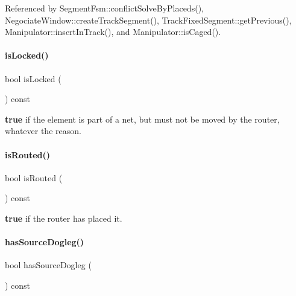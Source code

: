 Referenced by Segment\+Fsm\+::conflict\+Solve\+By\+Placeds(), Negociate\+Window\+::create\+Track\+Segment(), Track\+Fixed\+Segment\+::get\+Previous(), Manipulator\+::insert\+In\+Track(), and Manipulator\+::is\+Caged().

\mbox{\label{classKite_1_1TrackElement_a43966e19963e4bcb7f7f9b5327ec732b}} 
\paragraph{\texorpdfstring{is\+Locked()}{isLocked()}}
{\footnotesize\ttfamily bool is\+Locked (\begin{DoxyParamCaption}{ }\end{DoxyParamCaption}) const\hspace{0.3cm}{\ttfamily [inline]}}

{\bfseries true} if the element is part of a net, but must not be moved by the router, whatever the reason. \mbox{\label{classKite_1_1TrackElement_a29202b7dfab21852f8c8d773de7b3728}} 
\paragraph{\texorpdfstring{is\+Routed()}{isRouted()}}
{\footnotesize\ttfamily bool is\+Routed (\begin{DoxyParamCaption}{ }\end{DoxyParamCaption}) const\hspace{0.3cm}{\ttfamily [inline]}}

{\bfseries true} if the router has placed it. \mbox{\label{classKite_1_1TrackElement_ab0ab07d0bdd701562ecc14bbdb41368d}} 
\paragraph{\texorpdfstring{has\+Source\+Dogleg()}{hasSourceDogleg()}}
{\footnotesize\ttfamily bool has\+Source\+Dogleg (\begin{DoxyParamCaption}{ }\end{DoxyParamCaption}) const\hspace{0.3cm}{\ttfamily [inline]}}

